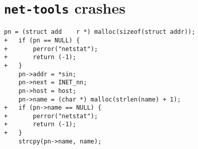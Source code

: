 \section{\texttt{net-tools} crashes}

\lstset{numbers=left}
\begin{lstlisting}[label={lst:netstat/malloc},firstnumber=213, caption={\texttt{netstat} crashes when \texttt{malloc} returns an error. The offending code is in the \texttt{net-tools} 1.60 source code, in \texttt{lib/inet.c:213}.}]
    pn = (struct add	r *) malloc(sizeof(struct addr));
+   if (pn == NULL) {
+   	perror("netstat");
+		return (-1);
+   }
    pn->addr = *sin;
    pn->next = INET_nn;
    pn->host = host;
    pn->name = (char *) malloc(strlen(name) + 1);
+   if (pn->name == NULL) {
+   	perror("netstat");
+		return (-1);
+   }
    strcpy(pn->name, name);
\end{lstlisting}
